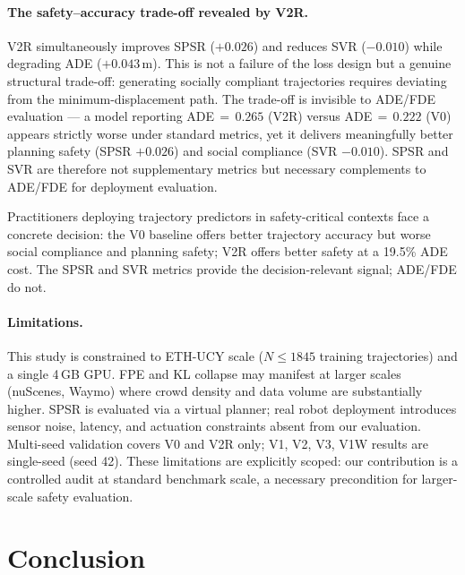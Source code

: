 \documentclass{article}
\begin{document}
\paragraph{The safety--accuracy trade-off revealed by V2R.}
V2R simultaneously improves SPSR (\(+0.026\)) and reduces SVR (\(-0.010\))
while degrading ADE (\(+0.043\)\,m). This is not a failure of the loss design
but a genuine structural trade-off: generating socially compliant trajectories
requires deviating from the minimum-displacement path. The trade-off is
invisible to ADE/FDE evaluation --- a model reporting ADE\,\(=\,0.265\) (V2R)
versus ADE\,\(=\,0.222\) (V0) appears strictly worse under standard metrics,
yet it delivers meaningfully better planning safety (SPSR \(+0.026\)) and
social compliance (SVR \(-0.010\)). SPSR and SVR are therefore not
supplementary metrics but necessary complements to ADE/FDE for deployment
evaluation.

Practitioners deploying trajectory predictors in safety-critical contexts
face a concrete decision: the V0 baseline offers better trajectory accuracy
but worse social compliance and planning safety; V2R offers better safety at
a 19.5\% ADE cost. The SPSR and SVR metrics provide the decision-relevant
signal; ADE/FDE do not.

\paragraph{Limitations.}
This study is constrained to ETH-UCY scale (\(N \leq 1845\) training
trajectories) and a single 4\,GB GPU. FPE and KL collapse may manifest at
larger scales (nuScenes, Waymo) where crowd density and data volume are
substantially higher. SPSR is evaluated via a virtual planner; real robot
deployment introduces sensor noise, latency, and actuation constraints absent
from our evaluation. Multi-seed validation covers V0 and V2R only; V1, V2, V3,
V1W results are single-seed (seed 42). These limitations are explicitly scoped:
our contribution is a controlled audit at standard benchmark scale, a necessary
precondition for larger-scale safety evaluation.


\section{Conclusion}
\label{sec:conclusion}
\end{document}
